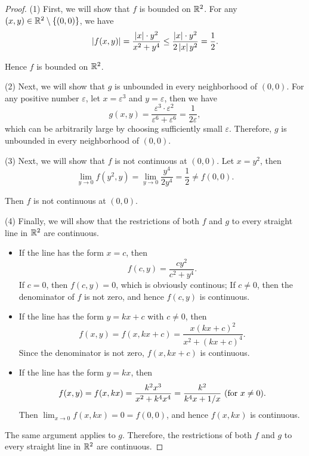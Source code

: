 \documentclass{article}
\begin{document}
\begin{proof}
  (1) First, we will show that \( f \) is bounded on \( \mathbb{R}^2 \). For any \( (x,y)\in\mathbb{R}^2\setminus\{(0,0)\} \), we have
  \[ \left|f(x,y)\right|=\frac{\left|x\right|\cdot y^2}{x^2+y^4}\le\frac{\left|x\right|\cdot y^2}{2\left|x\right|y^2}=\frac{1}{2}. \]\par
  Hence \( f \) is bounded on \( \mathbb{R}^2 \). \par
  (2) Next, we will show that \( g \) is unbounded in every neighborhood of \( (0,0) \). For any positive number \( \varepsilon \), let  \( x=\varepsilon^3 \) and \( y=\varepsilon \), then we have
  \[ g(x,y)=\frac{\varepsilon^3\cdot\varepsilon^2}{\varepsilon^6+\varepsilon^6}=\frac{1}{2\varepsilon}, \]
  which can be arbitrarily large by choosing sufficiently small \( \varepsilon \). Therefore, \( g \) is unbounded in every neighborhood of \( (0,0) \). \par
  (3) Next, we will show that \( f \) is not continuous at \( (0,0) \). Let \( x=y^2 \), then
  \[ \lim_{y\to 0}f(y^2,y)=\lim_{y\to 0}\frac{y^4}{2y^4}=\frac{1}{2}\neq f(0,0). \]\par
  Then \( f \) is not continuous at \( (0,0) \). \par
  (4) Finally, we will show that the restrictions of both \( f \) and \( g \) to every straight line in \( \mathbb{R}^2 \) are continuous. \begin{itemize}
    \item If the line has the form \( x=c \), then
    \[ f(c,y)=\frac{c y^2}{c^2+y^4}. \]
    If \( c=0 \), then \( f(c,y)=0 \), which is obviously continous; If \( c\neq 0 \), then the denominator of \( f \) is not zero, and hence \( f(c,y) \) is continuous. \par
    \item If the line has the form \( y=kx+c \) with \( c\neq 0 \), then
    \[ f(x,y)=f(x,kx+c)=\frac{x(kx+c)^2}{x^2+(kx+c)^4}. \]
    Since the denominator is not zero, \( f(x,kx+c) \) is continuous.\par
    \item If the line has the form \( y=kx \), then
    \[ f(x,y)=f(x,kx)=\frac{k^2 x^3}{x^2+k^4 x^4}=\frac{k^2}{k^4x+1/x}\text{ (for \( x\neq 0 \))}. \]
    Then \( \lim_{x\to 0}f(x,kx)=0=f(0,0) \), and hence \( f(x,kx) \) is continuous.
  \end{itemize}\par
  The same argument applies to \( g \). Therefore, the restrictions of both \( f \) and \( g \) to every straight line in \( \mathbb{R}^2 \) are continuous.
\end{proof}
\end{document}
